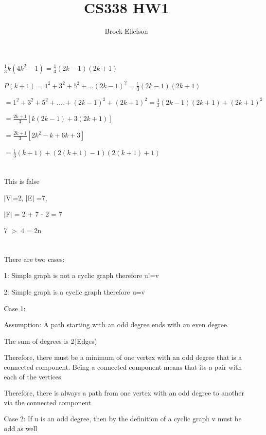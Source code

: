 \documentclass[11pt]{article} %
\title{CS338 HW1}
\author{Brock Ellefson}
\begin{document}
\maketitle

\section{}

$\frac{1}{3} k(4k^{2}-1) = \frac{1}{3} (2k-1)(2k+1)$


$P(k + 1)= 1^{2} + 3^{2} + 5^{2} + ... (2k-1)^{2} = \frac{1}{3} (2k-1)(2k+1)$


$= 1^{2} + 3^{2} + 5^{2}+....+(2k-1)^{2} + (2k+1)^{2} = \frac{1}{3} (2k-1)(2k+1) + (2k+1)^{2} $


$= \frac{2k+1}{3}[k(2k-1) + 3(2k+1)]$


$= \frac{2k+1}{3}[2k^{2}-k+6k+3]$


$= \frac{1}{3}(k+1) +(2(k+1)-1)(2(k+1)+1)$

\section{}
This is false

$\mid$V$\mid$=2, $\mid$E$\mid$ =7, 

$\mid$F$\mid$ = 2 + 7 - 2 = 7

7 $>$ 4 = 2n 

\section{}

There are two cases:

1: Simple graph is not a cyclic graph therefore u!=v

2: Simple graph is a cyclic graph therefore u=v


Case 1:

 Assumption: A path starting with an odd degree ends with an even degree.
 
 The sum of degrees is 2(Edges)
 
 Therefore, there must be a minimum of one vertex with an odd degree that is a connected component. Being a connected component means that its a pair with each of the vertices.
 
 Therefore, there is always a path from one vertex with an odd degree to another via the connected component 


Case 2: If u is an odd degree, then by the definition of a cyclic graph v must be odd as well
\end{document}

